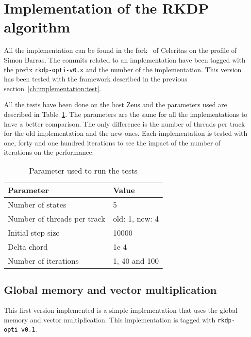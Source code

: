 \section{Implementation of the RKDP algorithm}
\label{ch:implementation:rkdp}

All the implementation can be found in the fork~\cite{fork-celeritas} of
Celeritas on the profile of Simon Barras.
The commits related to an implementation have been tagged with the prefix
\texttt{rkdp-opti-v0.x} and the number of the implementation.
This version has been tested with the framework described in the previous
section~\ref{ch:implementation:test}.

All the tests have been done on the host Zeus and the parameters used are
described in Table~\ref{tab:implementation:rkdp:parameters}.
The parameters are the same for all the implementations to have a better
comparison.
The only difference is the number of threads per track for the old implementation
and the new ones.
Each implementation is tested with one, forty and one hundred iterations to see
the impact of the number of iterations on the performance.


\begin{table}[ht]
    \centering
    \begin{tabular}{|l|l|}
        \hline
        \textbf{Parameter} & \textbf{Value} \\
        \hline
        Number of states & 5 \\
        \hline
        Number of threads per track & old: 1, new: 4 \\
        \hline
        Initial step size & 10000 \\
        \hline
        Delta chord & 1e-4 \\
        \hline
        Number of iterations & 1, 40 and 100 \\
        \hline
    \end{tabular}
    \caption{Parameter used to run the tests}
    \label{tab:implementation:rkdp:parameters}
\end{table}

\subsection{Global memory and vector multiplication}
\label{ch:implementation:rkdp:global-vecmult}

This first version implemented is a simple implementation that uses the global
memory and vector multiplication.
This implementation is tagged with \texttt{rkdp-opti-v0.1}.

